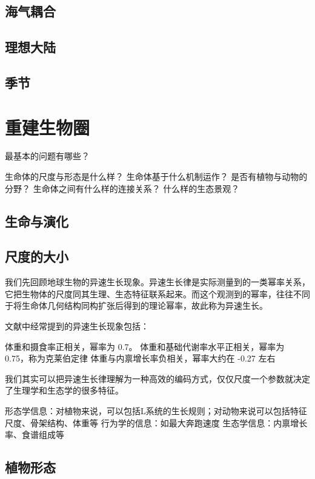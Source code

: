 \documentclass[a4paper,10.5pt]{book}
\begin{document}
\section{海气耦合}

\section{理想大陆}

\section{季节}




\chapter{重建生物圈}

最基本的问题有哪些？

生命体的尺度与形态是什么样？
生命体基于什么机制运作？
是否有植物与动物的分野？
生命体之间有什么样的连接关系？
什么样的生态景观？

\section{生命与演化}

\section{尺度的大小}

我们先回顾地球生物的异速生长现象。异速生长律是实际测量到的一类幂率关系，
它把生物体的尺度同其生理、生态特征联系起来。而这个观测到的幂率，往往不同于将生命体几何结构同构扩张后得到的理论幂率，故此称为异速生长。

文献中经常提到的异速生长现象包括：

体重和摄食率正相关，幂率为 0.7。
体重和基础代谢率水平正相关，幂率为 0.75，称为克莱伯定律
体重与内禀增长率负相关，幂率大约在 -0.27 左右

我们其实可以把异速生长律理解为一种高效的编码方式，仅仅尺度一个参数就决定了生理学和生态学的很多特征。

形态学信息：对植物来说，可以包括L系统的生长规则；对动物来说可以包括特征尺度、骨架结构、体重等
行为学的信息：如最大奔跑速度
生态学信息：内禀增长率、食谱组成等

\section{植物形态}
\end{document}
